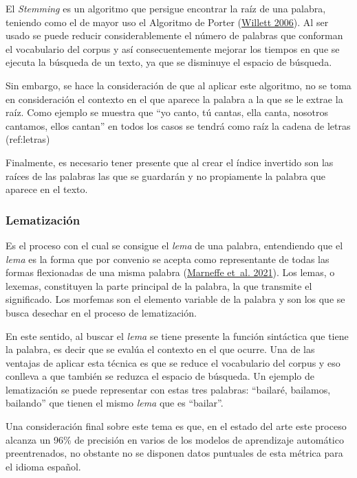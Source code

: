 \documentclass[
  12pt,
  openany]{book}
\begin{document}
El \emph{Stemming} es un algoritmo que persigue encontrar la raíz de una palabra, teniendo como el de mayor uso el Algoritmo de Porter (\protect\hyperlink{ref-willett2006}{Willett 2006}). Al ser usado se puede reducir considerablemente el número de palabras que conforman el vocabulario del corpus y así consecuentemente mejorar los tiempos en que se ejecuta la búsqueda de un texto, ya que se disminuye el espacio de búsqueda.

Sin embargo, se hace la consideración de que al aplicar este algoritmo, no se toma en consideración el contexto en el que aparece la palabra a la que se le extrae la raíz. Como ejemplo se muestra que ``yo canto, tú cantas, ella canta, nosotros cantamos, ellos cantan'' en todos los casos se tendrá como raíz la cadena de letras (ref:letras)

Finalmente, es necesario tener presente que al crear el índice invertido son las raíces de las palabras las que se guardarán y no propiamente la palabra que aparece en el texto.

\hypertarget{lemma}{%
\subsubsection{Lematización}\label{lemma}}

Es el proceso con el cual se consigue el \emph{lema} de una palabra, entendiendo que el \emph{lema} es la forma que por convenio se acepta como representante de todas las formas flexionadas de una misma palabra (\protect\hyperlink{ref-demarneffe2021}{Marneffe et~al. 2021}). Los lemas, o lexemas, constituyen la parte principal de la palabra, la que transmite el significado. Los morfemas son el elemento variable de la palabra y son los que se busca desechar en el proceso de lematización.

En este sentido, al buscar el \emph{lema} se tiene presente la función sintáctica que tiene la palabra, es decir que se evalúa el contexto en el que ocurre. Una de las ventajas de aplicar esta técnica es que se reduce el vocabulario del corpus y eso conlleva a que también se reduzca el espacio de búsqueda. Un ejemplo de lematización se puede representar con estas tres palabras: ``bailaré, bailamos, bailando'' que tienen el mismo \emph{lema} que es ``bailar''.

Una consideración final sobre este tema es que, en el estado del arte este proceso alcanza un 96\% de precisión en varios de los modelos de aprendizaje automático preentrenados, no obstante no se disponen datos puntuales de esta métrica para el idioma español.
\end{document}

